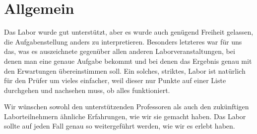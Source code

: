 \section{Allgemein}

Das Labor wurde gut unterstützt, aber es wurde auch genügend Freiheit gelassen,
die Aufgabenstellung anders zu interpretieren. Besonders letzteres war für uns
das, was es auszeichnete gegenüber allen anderen Laborveranstaltungen, bei
denen man eine genaue Aufgabe bekommt und bei denen das Ergebnis genau mit den
Erwartungen übereinstimmen soll. Ein solches, striktes, Labor ist natürlich für
den Prüfer um vieles einfacher, weil dieser nur Punkte auf einer Liste
durchgehen und nachsehen muss, ob alles funktioniert.

Wir wünschen sowohl den unterstützenden Professoren als auch den zukünftigen
Laborteilnehmern ähnliche Erfahrungen, wie wir sie gemacht haben. Das Labor
sollte auf jeden Fall genau so weitergeführt werden, wie wir es erlebt haben.


